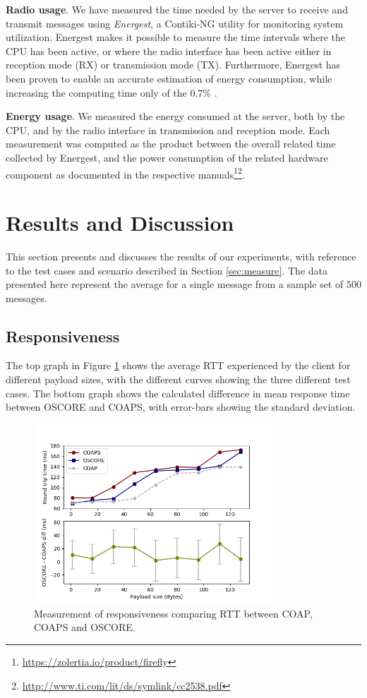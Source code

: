 {\noindent
\textbf{Radio usage}. We have measured the time needed by the server to receive and transmit messages using \emph{Energest}, a Contiki-NG utility for monitoring system utilization. Energest makes it possible to measure the time intervals where the CPU has been active, or where the radio interface has been active either in reception mode (RX) or transmission mode (TX). Furthermore, Energest has been proven to enable an accurate estimation of energy consumption, while increasing the computing time only of the $0.7\%$ \cite{energest}.

\noindent
\textbf{Energy usage}. We measured the energy consumed at the server, both by the CPU, and by the radio interface in transmission and reception mode. Each measurement was computed as the product between the overall related time collected by Energest, and the power consumption of the related hardware component as documented in the respective manuals\footnote{\url{https://zolertia.io/product/firefly}}\footnote{\url{http://www.ti.com/lit/ds/symlink/cc2538.pdf}}.

\section{Results and Discussion}
\label{sec:results}

This section presents and discusses the results of our experiments, with reference to the test cases and scenario described in Section \ref{sec:measure}. The data presented here represent the average for a single message from a sample set of $500$ messages.

\subsection{Responsiveness}
The top graph in Figure \ref{fig:rtt} shows the average RTT experienced by the client for different payload sizes, with the different curves showing the three different test cases. The bottom graph shows the calculated difference in mean response time between OSCORE and COAPS, with error-bars showing the standard deviation.

\begin{figure}[ht]
\centering
\includegraphics[width=0.8\textwidth]{papers/oscore/images/rtt.png}
\caption[RTT measurements]{Measurement of responsiveness comparing RTT between COAP, COAPS and OSCORE. }
\label{fig:rtt}
\end{figure}

}

